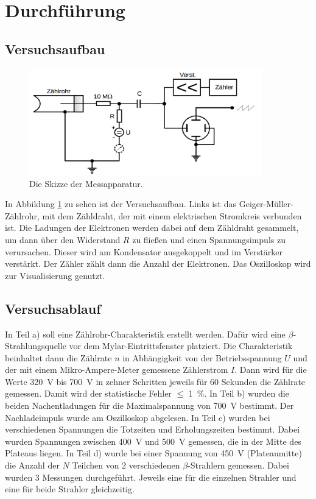 \documentclass[
  bibliography=totoc,     %
  captions=tableheading,  %
  titlepage=firstiscover, %
]{scrartcl}
\begin{document}
\section{Durchführung}
\subsection{Versuchsaufbau}
\begin{figure}[htb]
  \centering
  \includegraphics[width=0.9\textwidth]{V7035.png}
  \caption{Die Skizze der Messapparatur.}
  \label{fig:V7035}
\end{figure}
In Abbildung \ref{fig:V7035} zu sehen ist der Versuchsaufbau. Links ist das
Geiger-Müller-Zählrohr, mit dem Zähldraht, der mit einem
elektrischen Stromkreis verbunden ist. Die Ladungen der Elektronen werden dabei
auf dem Zähldraht gesammelt, um dann über den Widerstand $R$ zu fließen
und einen Spannungsimpuls zu verursachen. Dieser wird am Kondensator
ausgekoppelt und im Verstärker verstärkt. Der Zähler zählt dann die Anzahl
der Elektronen. Das Oszilloskop wird zur Visualisierung genutzt.
\subsection{Versuchsablauf}
In Teil a) soll eine Zählrohr-Charakteristik erstellt werden. Dafür wird eine
$\beta$-Strahlungsquelle vor dem Mylar-Eintrittsfenster platziert. Die
Charakteristik beinhaltet dann die Zählrate $n$ in Abhängigkeit von der
Betriebsspannung $U$ und der mit einem Mikro-Ampere-Meter gemessene Zählerstrom $I$.
Dann wird für die Werte \SI{320}{\volt} bis \SI{700}{\volt} in zehner Schritten
jeweils für 60 Sekunden die Zählrate gemessen. Damit wird der statistische
Fehler $\leq$ \SI{1}{\percent}.
In Teil b) wurden die beiden Nachentladungen für die Maximalspannung von
\SI{700}{\volt} bestimmt. Der Nachladeimpuls wurde am Oszilloskop abgelesen.
In Teil c) wurden bei verschiedenen Spannungen die Totzeiten und Erholungszeiten
bestimmt. Dabei wurden Spannungen zwischen \SI{400}{\volt} und \SI{500}{\volt}
gemessen, die in der Mitte des Plateaus liegen.
In Teil d) wurde bei einer Spannung von \SI{450}{\volt} (Plateaumitte) die
Anzahl der $N$ Teilchen von 2 verschiedenen $\beta$-Strahlern gemessen. Dabei
wurden 3 Messungen durchgeführt. Jeweils eine für die einzelnen Strahler und eine
für beide Strahler gleichzeitig.
\end{document}
